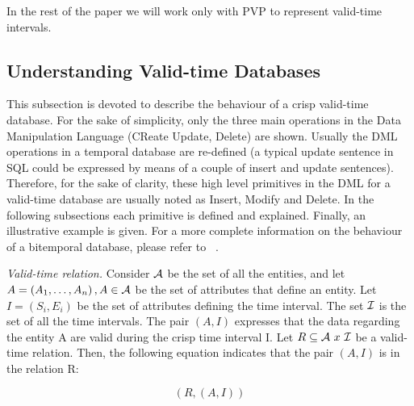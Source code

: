 In the rest of the paper we will work only with PVP to represent valid-time intervals.


\subsection{\label{subsubsec:Understanding-valid-time-databases}Understanding Valid-time Databases}
This subsection is devoted to describe the behaviour of a crisp valid-time database. For the sake of simplicity, only the three main operations in the Data Manipulation Language (CReate Update, Delete) are shown. Usually the DML operations in a temporal database are re-defined (a typical update sentence in SQL could be expressed by means of a couple of insert and update sentences). Therefore, for the sake of clarity, these high level primitives in the DML for a valid-time database are usually noted as Insert, Modify and Delete. In the following subsections each primitive is defined and explained. Finally, an illustrative example is given. For a more complete information on the behaviour of a bitemporal database, please refer to ~\cite{Jensen1994}.

\begin{definition}
\emph{Valid-time relation.}
Consider $\mathcal{A}$ be the set of all the entities, and let $A=\left(A_1, \ldots, A_n \right), A \in \mathcal{A}$ be the set of attributes that define an entity. Let $I = \left(S_i, E_i \right)$ be the set of attributes defining the time interval. The set $\mathcal{I}$ is the set of all the time intervals. The pair $\left(A, I\right)$ expresses that the data regarding the entity A are valid during the crisp time interval I. Let $R \subseteq \mathcal{A} \  x\  \mathcal{I}$ be a valid-time relation. Then, the following equation indicates that the pair $\left(A, I\right)$ is in the relation R:

\begin{equation}
\label{eq:rel-def}
\left( R, \left(A , I\right) \right)
\end{equation}
\end{definition}

